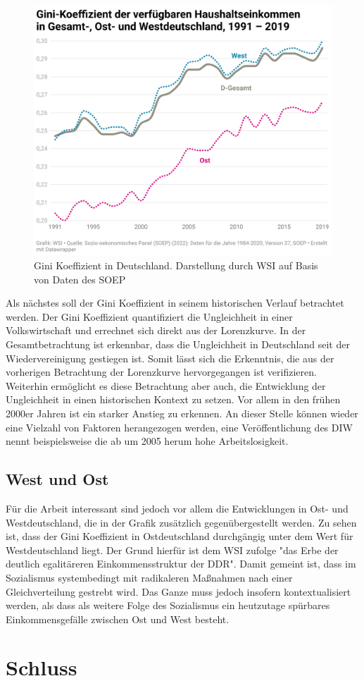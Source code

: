 \documentclass[a4paper,12pt]{article}
\begin{document}
\begin{figure}[h]
\centering
\includegraphics*[width=1.0\textwidth]{gini}
\caption[short]{Gini Koeffizient in Deutschland. Darstellung durch WSI auf Basis von Daten des SOEP \cite{wsi_2024}}
\end{figure}

Als nächstes soll der Gini Koeffizient in seinem historischen Verlauf betrachtet werden. Der Gini Koeffizient quantifiziert die Ungleichheit in einer Volkswirtschaft und errechnet sich direkt aus der Lorenzkurve. In der Gesamtbetrachtung
ist erkennbar, dass die Ungleichheit in Deutschland seit der Wiedervereinigung gestiegen ist. Somit lässt sich die Erkenntnis, die aus der vorherigen Betrachtung der Lorenzkurve hervorgegangen ist verifizieren. Weiterhin ermöglicht es diese Betrachtung aber auch, 
die Entwicklung der Ungleichheit in einen historischen Kontext zu setzen. Vor allem in den frühen 2000er Jahren ist ein starker Anstieg zu erkennen. An dieser Stelle können wieder eine Vielzahl von Faktoren herangezogen werden, eine Veröffentlichung des DIW nennt beispielsweise
die ab um 2005 herum hohe Arbeitslosigkeit. \cite{grabka_goebel_2020}

\subsection*{West und Ost}

Für die Arbeit interessant sind jedoch vor allem die Entwicklungen in Ost- und Westdeutschland, die in der Grafik zusätzlich gegenübergestellt werden. Zu sehen ist, dass der Gini Koeffizient in Ostdeutschland durchgängig unter dem Wert für Westdeutschland liegt. Der Grund
hierfür ist dem WSI zufolge "das Erbe der deutlich egalitäreren Einkommensstruktur der DDR". \cite{wsi_2024} Damit gemeint ist, dass im Sozialismus systembedingt mit radikaleren Maßnahmen nach einer Gleichverteilung gestrebt wird.
Das Ganze muss jedoch insofern kontextualisiert werden, als dass als weitere Folge des Sozialismus ein heutzutage spürbares Einkommensgefälle zwischen Ost und West besteht. \cite{gebauer_martens_2020}


\section*{Schluss}

\newpage
{}
\printbibliography
\thispagestyle{empty}
\end{document}

